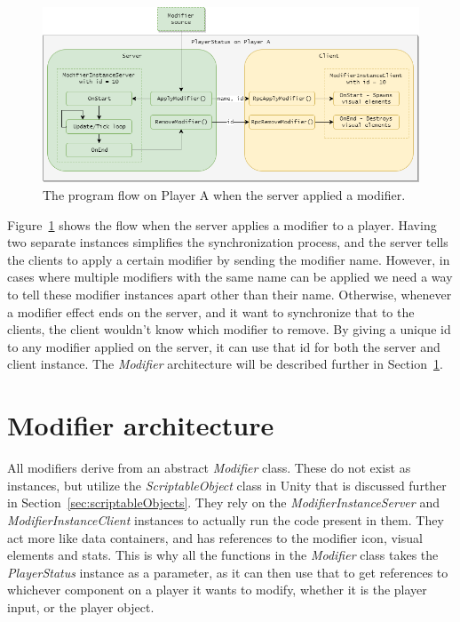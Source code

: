 \begin{figure}[tbph]
  \centering
  \includegraphics[width=\textwidth]{images/ApplyModifier}
  \caption[Program flow when applying a modifier]{The program flow on Player A when the server applied a modifier.}
  \label{fig:applyModifier}
\end{figure}
 
Figure~\ref{fig:applyModifier} shows the flow when the server applies a modifier to a player. Having two separate instances simplifies the synchronization process, and the server tells the clients to apply a certain modifier by sending the modifier name. However, in cases where multiple modifiers with the same name can be applied we need a way to tell these modifier instances apart other than their name. Otherwise, whenever a modifier effect ends on the server, and it want to synchronize that to the clients, the client wouldn't know which modifier to remove. By giving a unique id to any modifier applied on the server, it can use that id for both the server and client instance. The
\emph{Modifier} architecture will be described further in Section~\ref{sec:modifiers}.

\section{Modifier architecture}
\label{sec:modifiers}

All modifiers derive from an abstract \emph{Modifier} class. These do not exist as instances, but utilize the \emph{ScriptableObject} class in Unity that is discussed further in Section~\ref{sec:scriptableObjects}. They rely on the \emph{ModifierInstanceServer} and \emph{ModifierInstanceClient} instances to actually run the code present in them. They act more like data containers, and has references to the modifier icon, visual elements and stats. This is why all the functions in the \emph{Modifier} class takes the \emph{PlayerStatus} instance as a parameter, as it can then use that to get references to whichever component on a player it wants to modify, whether it is the player input, or the player object.

